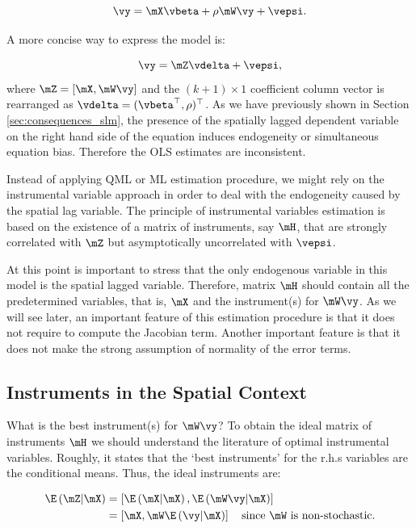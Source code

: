 \documentclass[english,12pt]{book}\usepackage[]{graphicx}\usepackage[]{xcolor}
\begin{document}
\begin{equation*}
  \vy =   \mX\vbeta + \rho\mW\vy + \vepsi.
\end{equation*}

A more concise way to express the model is:

\begin{equation*}
  \vy = \mZ \vdelta + \vepsi,
\end{equation*}
%
where $\mZ = \left[\mX, \mW\vy\right]$ and the $(k + 1)\times 1$ coefficient column vector is rearranged as  $\vdelta = (\vbeta^\top, \rho)^\top$. As we have previously shown in Section \ref{sec:consequences_slm}, the presence of the spatially lagged dependent variable on the right hand side of the equation induces endogeneity or simultaneous equation bias. Therefore the OLS estimates are inconsistent.

Instead of applying QML or ML estimation procedure, we might rely on the instrumental variable approach in order to deal with the endogeneity caused by the spatial lag variable. The principle of instrumental variables estimation is based on the existence of a matrix of instruments, say $\mH$,  that are strongly correlated with $\mZ$ but asymptotically uncorrelated with $\vepsi$. 

At this point is important to stress that the only endogenous variable in this model is the spatial lagged variable. Therefore, matrix $\mH$ should contain all the predetermined variables, that is, $\mX$ and the instrument(s) for $\mW\vy$. As we will see later, an important feature of this estimation procedure is that it does not require to compute the Jacobian term. Another important feature is that it does not make the strong assumption of normality of the error terms. 

\subsection{Instruments in the Spatial Context}

What is the best instrument(s) for $\mW\vy$? To obtain the ideal matrix of instruments $\mH$ we should understand the literature of optimal instrumental variables. Roughly, it states that the `best instruments' for the r.h.s variables are the conditional means. Thus, the ideal instruments are:

\begin{equation*}
  \begin{aligned}
\E\left(\mZ| \mX \right) & = \left[\E\left(\mX| \mX\right), \E\left(\mW\vy| \mX\right)\right] \\
                         & = \left[\mX, \mW \E\left(\vy|\mX\right)\right]\quad \mbox{since $\mW$ is non-stochastic}.
\end{aligned}
\end{equation*}
\end{document}
